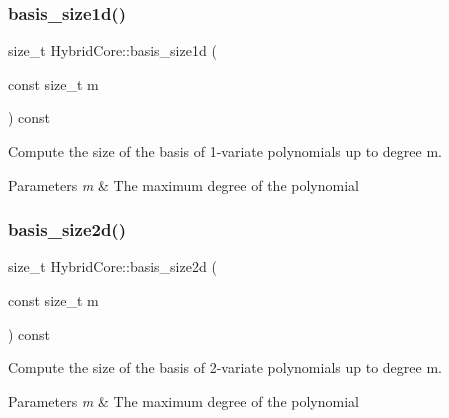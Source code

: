 \subsubsection{\texorpdfstring{basis\+\_\+size1d()}{basis\_size1d()}}
{\footnotesize\ttfamily size\+\_\+t Hybrid\+Core\+::basis\+\_\+size1d (\begin{DoxyParamCaption}\item[{const size\+\_\+t}]{m }\end{DoxyParamCaption}) const}



Compute the size of the basis of 1-\/variate polynomials up to degree m. 


\begin{DoxyParams}{Parameters}
{\em m} & The maximum degree of the polynomial \\
\hline
\end{DoxyParams}
\mbox{\label{classHArDCore2D_1_1HybridCore_a09aabd37f36e11bbcfffbb5bb59e54d2}} 
\subsubsection{\texorpdfstring{basis\+\_\+size2d()}{basis\_size2d()}}
{\footnotesize\ttfamily size\+\_\+t Hybrid\+Core\+::basis\+\_\+size2d (\begin{DoxyParamCaption}\item[{const size\+\_\+t}]{m }\end{DoxyParamCaption}) const}



Compute the size of the basis of 2-\/variate polynomials up to degree m. 


\begin{DoxyParams}{Parameters}
{\em m} & The maximum degree of the polynomial \\
\hline
\end{DoxyParams}
\mbox{\label{classHArDCore2D_1_1HybridCore_a34242db07cc2b3c3b867d9e4580b634d}} 

